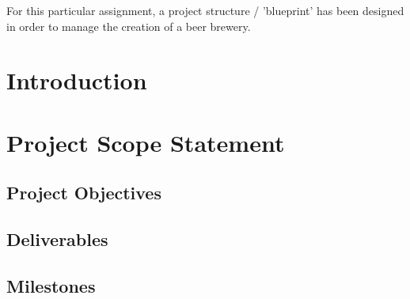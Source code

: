 \noindent
For this particular assignment, a project structure / 'blueprint' has been designed in order to manage the creation of a beer brewery.

\tableofcontents
\listoffigures
\listoftables

\section{Introduction}

\section{Project Scope Statement}
\subsection{Project Objectives}
\subsection{Deliverables}

\newpage
\subsection{Milestones}


